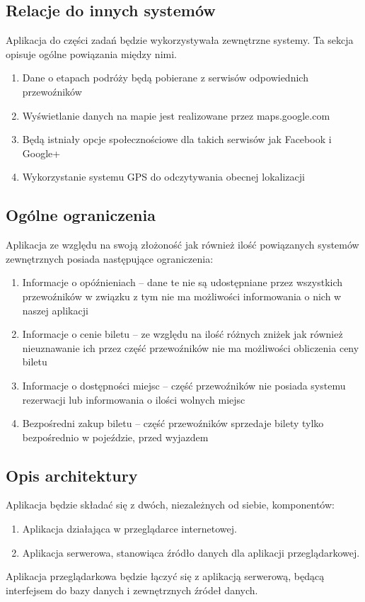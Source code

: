 \documentclass[12pt,a4paper]{report}
\begin{document}
\subsection{Relacje do innych systemów}
	Aplikacja do części zadań będzie wykorzystywała zewnętrzne systemy. Ta sekcja opisuje ogólne powiązania między nimi.
\begin{enumerate}
	\item Dane o etapach podróży będą pobierane z serwisów odpowiednich przewoźników
	\item Wyświetlanie danych na mapie jest realizowane przez maps.google.com
	\item Będą istniały opcje społecznościowe dla takich serwisów jak Facebook i Google+
	\item Wykorzystanie systemu GPS do odczytywania obecnej lokalizacji
\end{enumerate}
\newpage
\subsection{Ogólne ograniczenia}
	Aplikacja ze względu na swoją złożoność jak również ilość powiązanych systemów zewnętrznych posiada następujące ograniczenia:	
\begin{enumerate}
	\item Informacje o opóźnieniach -- dane te nie są udostępniane przez wszystkich przewoźników w związku z tym nie ma możliwości informowania o nich w naszej aplikacji
	\item Informacje o cenie biletu -- ze względu na ilość różnych zniżek jak również nieuznawanie ich przez część przewoźników nie ma możliwości obliczenia ceny biletu
	\item Informacje o dostępności miejsc -- część przewoźników nie posiada systemu rezerwacji lub informowania o ilości wolnych miejsc
	\item Bezpośredni zakup biletu -- część przewoźników sprzedaje bilety tylko bezpośrednio w pojeździe, przed wyjazdem
\end{enumerate}
\subsection{Opis architektury}
Aplikacja będzie składać się z dwóch, niezależnych od siebie, komponentów:
\begin{enumerate}
	\item Aplikacja działająca w przeglądarce internetowej.
	\item Aplikacja serwerowa, stanowiąca źródło danych dla aplikacji przeglądarkowej.
\end{enumerate} 
	Aplikacja przeglądarkowa będzie łączyć się z aplikacją serwerową, będącą interfejsem do bazy danych i zewnętrznych źródeł danych.
\end{document}
